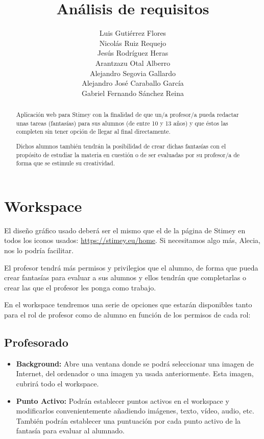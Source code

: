 \documentclass[12pt,letterpaper]{article}
\title{Análisis de requisitos}
\author{Luis Gutiérrez Flores\\
	Nicolás Ruiz Requejo\\
	Jesús Rodríguez Heras\\
	Arantzazu Otal Alberro\\
	Alejandro Segovia Gallardo\\
	Alejandro José Caraballo García\\
	Gabriel Fernando Sánchez Reina}
\begin{document}
	
	\maketitle
	\begin{abstract} %
			Aplicación web para Stimey con la finalidad de que un/a profesor/a pueda redactar unas tareas (fantasías) para sus alumnos (de entre 10 y 13 años) y que éstos las completen sin tener opción de llegar al final directamente.
			
			Dichos alumnos también tendrán la posibilidad de crear dichas fantasías con el propósito de estudiar la materia en cuestión o de ser evaluadas por su profesor/a de forma que se estimule su creatividad.
	\end{abstract}
	\thispagestyle{empty}
	\newpage
	
	
	
	
	
	\lstset{language=bash, numbers=left, numberstyle=\tiny, numbersep=10pt, firstnumber=1, stepnumber=1, basicstyle=\small\ttfamily, tabsize=1, extendedchars=true, inputencoding=latin1}

\section{Workspace}
El diseño gráfico usado deberá ser el mismo que el de la página de Stimey en todos los iconos usados: \url{https://stimey.eu/home}. Si necesitamos algo más, Alecia, nos lo podría facilitar.

El profesor tendrá más permisos y privilegios que el alumno, de forma que pueda crear fantasías para evaluar a sus alumnos y ellos tendrán que completarlas o crear las que el profesor les ponga como trabajo.

En el workspace tendremos una serie de opciones que estarán disponibles tanto para el rol de profesor como de alumno en función de los permisos de cada rol:

\subsection{Profesorado}
\begin{itemize}
	\item \textbf{Background:} Abre una ventana donde se podrá seleccionar una imagen de Internet, del ordenador o una imagen ya usada anteriormente. Esta imagen, cubrirá todo el workspace.
	\item \textbf{Punto Activo:} Podrán establecer puntos activos en el workspace y modificarlos convenientemente añadiendo imágenes, texto, vídeo, audio, etc. También podrán establecer una puntuación por cada punto activo de la fantasía para evaluar al alumnado.
\end{itemize}
\end{document}
